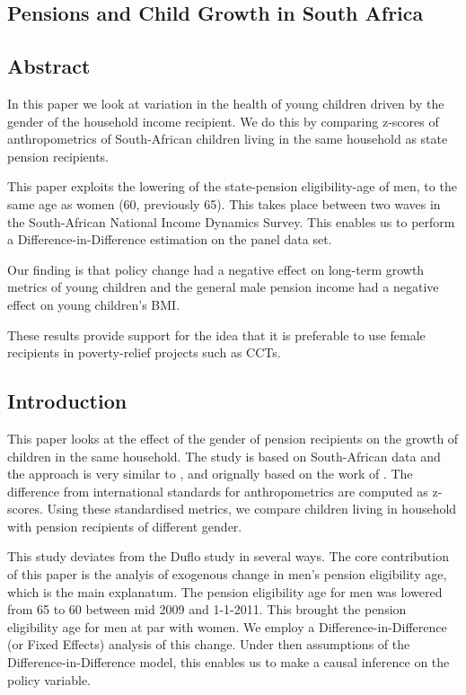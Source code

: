 \begin{refsection}
\chapter{Pensions and Child Growth in South Africa}
\label{sa}
\section*{Abstract}
In this paper we look at variation in the health of young children driven by the gender of the household income recipient.
We do this by comparing z-scores of anthropometrics of South-African children living in the same household as state pension recipients.

This paper exploits the lowering of the state-pension eligibility-age of men, 
to the same age as women (60, previously 65).
This takes place between two waves in the South-African National Income Dynamics Survey.
This enables us to perform a Difference-in-Difference estimation on the panel data set.

Our finding is that policy change had a negative effect on long-term growth metrics of young children
and the general male pension income had a negative effect on young children's BMI.

These results provide support for the idea that it is preferable to use female recipients in poverty-relief projects such as CCTs.
\pagebreak

\section{Introduction}
\label{sa:intro}
This paper looks at the effect of the gender of pension recipients on the growth of children in the same household.
The study is based on South-African data and the approach is very similar to \textcite{duflo2000child,duflo2003grandmothers},
and orignally based on the work of \textcite{thomas1994like}.
The difference from international standards \parencite[WHO Child Growth Standards]{who2006child} for anthropometrics are computed as z-scores.
Using these standardised metrics, we compare children living in household with pension recipients of different gender.

This study deviates from the Duflo study in several ways.
The core contribution of this paper is the analyis of exogenous change in men's pension eligibility age,
which is the main explanatum.
The pension eligibility age for men was lowered from 65 to 60 between mid 2009 and 1-1-2011.
This brought the pension eligibility age for men at par with women.
We employ a Difference-in-Difference (or Fixed Effects) analysis of this change.
Under then assumptions of the Difference-in-Difference model,
this enables us to make a causal inference on the policy variable.


\end{refsection}
